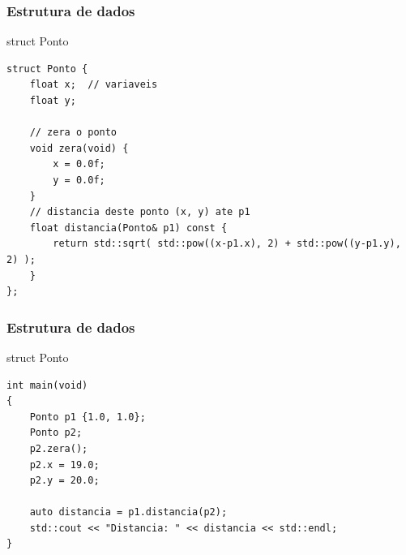 \documentclass[xcolor={usenames,dvipsnames},10pt,compress,aspectratio=169]{beamer}
\begin{document}
\begin{frame}[fragile]
  \frametitle{Estrutura de dados}
  \begin{block}{struct Ponto}
\begin{lstlisting}
struct Ponto {
    float x;  // variaveis
    float y;

    // zera o ponto 
    void zera(void) {
        x = 0.0f;
        y = 0.0f;
    }
    // distancia deste ponto (x, y) ate p1
    float distancia(Ponto& p1) const {
        return std::sqrt( std::pow((x-p1.x), 2) + std::pow((y-p1.y), 2) );
    }
};
\end{lstlisting}
  \end{block}
\end{frame}
\begin{frame}[fragile]
  \frametitle{Estrutura de dados}
  \begin{block}{struct Ponto}
\begin{lstlisting}
int main(void)
{
    Ponto p1 {1.0, 1.0};
    Ponto p2;
    p2.zera();
    p2.x = 19.0;
    p2.y = 20.0;

    auto distancia = p1.distancia(p2);
    std::cout << "Distancia: " << distancia << std::endl;
}
\end{lstlisting}
  \end{block}
\end{frame}
\end{document}

